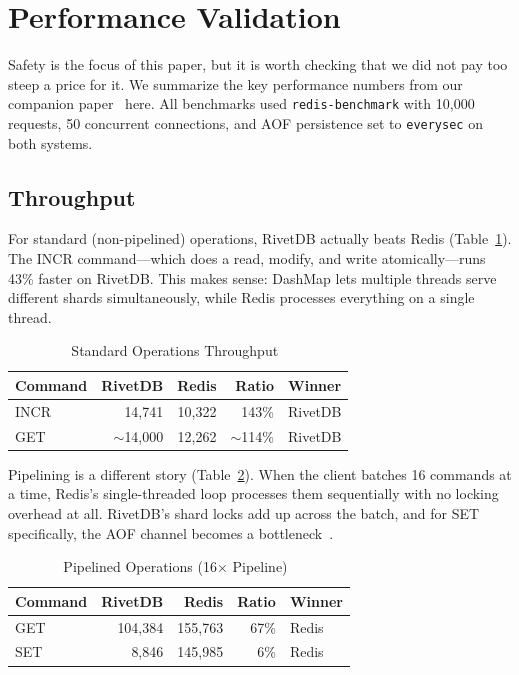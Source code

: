 \documentclass[conference,a4paper]{IEEEtran}
\begin{document}
\section{Performance Validation}

Safety is the focus of this paper, but it is worth checking that we did not pay too steep a price for it. We summarize the key performance numbers from our companion paper~\cite{shimpi2026rivetdb} here. All benchmarks used \texttt{redis-benchmark} with 10,000 requests, 50 concurrent connections, and AOF persistence set to \texttt{everysec} on both systems.

\subsection{Throughput}

For standard (non-pipelined) operations, RivetDB actually beats Redis (Table~\ref{tab:perf_standard}). The INCR command---which does a read, modify, and write atomically---runs 43\% faster on RivetDB. This makes sense: DashMap lets multiple threads serve different shards simultaneously, while Redis processes everything on a single thread.

\begin{table}[htbp]
\caption{Standard Operations Throughput~\cite{shimpi2026rivetdb}}
\label{tab:perf_standard}
\centering
\begin{tabular}{@{}lrrrl@{}}
\toprule
\textbf{Command} & \textbf{RivetDB} & \textbf{Redis} & \textbf{Ratio} & \textbf{Winner} \\
\midrule
INCR & 14,741 & 10,322 & 143\% & RivetDB \\
GET & $\sim$14,000 & 12,262 & $\sim$114\% & RivetDB \\
\bottomrule
\end{tabular}
\end{table}

Pipelining is a different story (Table~\ref{tab:perf_pipelined}). When the client batches 16 commands at a time, Redis's single-threaded loop processes them sequentially with no locking overhead at all. RivetDB's shard locks add up across the batch, and for SET specifically, the AOF channel becomes a bottleneck~\cite{shimpi2026rivetdb}.

\begin{table}[htbp]
\caption{Pipelined Operations (16$\times$ Pipeline)~\cite{shimpi2026rivetdb}}
\label{tab:perf_pipelined}
\centering
\begin{tabular}{@{}lrrrl@{}}
\toprule
\textbf{Command} & \textbf{RivetDB} & \textbf{Redis} & \textbf{Ratio} & \textbf{Winner} \\
\midrule
GET & 104,384 & 155,763 & 67\% & Redis \\
SET & 8,846 & 145,985 & 6\% & Redis \\
\bottomrule
\end{tabular}
\end{table}
\end{document}
